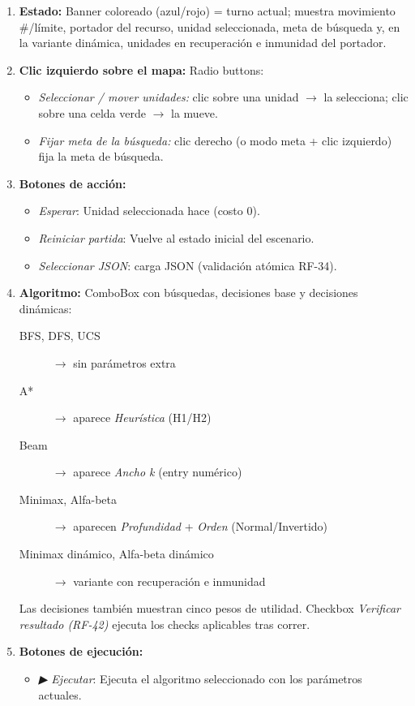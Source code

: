 \begin{enumerate}
\item \textbf{Estado:} Banner coloreado (azul/rojo) = turno actual; muestra movimiento \#/límite,
    portador del recurso, unidad seleccionada, meta de búsqueda y, en la variante dinámica,
    unidades en recuperación e inmunidad del portador.
\item \textbf{Clic izquierdo sobre el mapa:} Radio buttons:
    \begin{itemize}
    \item \textit{Seleccionar / mover unidades:} clic sobre una unidad $\to$ la selecciona; clic sobre una celda verde $\to$ la mueve.
    \item \textit{Fijar meta de la búsqueda:} clic derecho (o modo meta + clic izquierdo) fija la meta de búsqueda.
    \end{itemize}
\item \textbf{Botones de acción:}
    \begin{itemize}
    \item \textit{Esperar}: Unidad seleccionada hace  (costo 0).
    \item \textit{Reiniciar partida}: Vuelve al estado inicial del escenario.
    \item \textit{Seleccionar JSON}:  carga JSON (validación atómica RF-34).
    \end{itemize}
\item \textbf{Algoritmo:} ComboBox con búsquedas, decisiones base y decisiones dinámicas:
    \begin{description}
    \item[BFS, DFS, UCS] $\to$ sin parámetros extra
    \item[A*] $\to$ aparece \textit{Heurística} (H1/H2)
    \item[Beam] $\to$ aparece \textit{Ancho k} (entry numérico)
    \item[Minimax, Alfa-beta] $\to$ aparecen \textit{Profundidad} + \textit{Orden} (Normal/Invertido)
    \item[Minimax dinámico, Alfa-beta dinámico] $\to$ variante con recuperación e inmunidad
    \end{description}
    Las decisiones también muestran cinco pesos de utilidad. Checkbox \textit{Verificar resultado
    (RF-42)} ejecuta los checks aplicables tras correr.
\item \textbf{Botones de ejecución:}
    \begin{itemize}
    \item \textit{▶ Ejecutar}: Ejecuta el algoritmo seleccionado con los parámetros actuales.

\end{itemize}
\end{enumerate}
